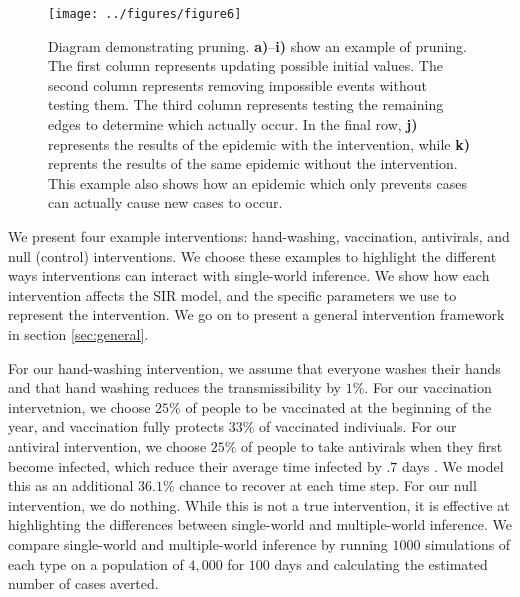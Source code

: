 \documentclass[openacc]{rsproca_new}%
\begin{document}
% 
\begin{figure}\label{fig:pruning}
\texttt{[image: ../figures/figure6]} %
\caption{Diagram demonstrating pruning. \textbf{a)}--\textbf{i)} show an example of pruning.  The first column represents updating possible initial values.  The second column represents removing impossible events without testing them.  The third column represents testing the remaining edges to determine which actually occur.  In the final row, \textbf{j)} represents the results of the epidemic with the intervention, while \textbf{k)} reprents the results of the same epidemic without the intervention.  This example also shows how an epidemic which only prevents cases can actually cause new cases to occur.}
\end{figure}

We present four example interventions: hand-washing, vaccination, antivirals, and null (control) interventions.
We choose these examples to highlight the different ways interventions can interact with single-world inference.
We show how each intervention affects the SIR model, and the specific parameters we use to represent the intervention.
We go on to present a general intervention framework in section \ref{sec:general}.

For our hand-washing intervention, we assume that everyone washes their hands and that hand washing reduces the transmissibility by $1\%$.
For our vaccination intervetnion, we choose $25\%$ of people to be vaccinated at the beginning of the year, and vaccination fully protects $33\%$ of vaccinated indiviuals.
For our antiviral intervention, we choose $25\%$ of people to take antivirals when they first become infected, which reduce their average time infected by $.7$ days \cite{}.
We model this as an additional $36.1\%$ chance to recover at each time step.
For our null intervention, we do nothing.
While this is not a true intervention, it is effective at highlighting the differences between single-world and multiple-world inference.
We compare single-world and multiple-world inference by running $1000$ simulations of each type on a population of $4,000$ for $100$ days and calculating the estimated number of cases averted.
\end{document}
